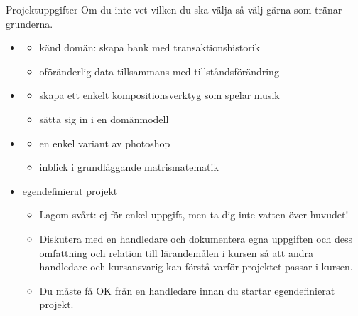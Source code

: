 \begin{Slide}{Projektuppgifter}\SlideFontTiny
Om du inte vet vilken du ska välja så välj gärna  som tränar grunderna.
\begin{itemize}\SlideFontTiny
\item {}
\begin{itemize}\SlideFontTiny
\item känd domän: skapa bank med transaktionshistorik 
\item oföränderlig data tillsammans med tillståndsförändring
\end{itemize}


\item {}
\begin{itemize}\SlideFontTiny
\item skapa ett enkelt kompositionsverktyg som spelar musik
\item sätta sig in i en domänmodell
\end{itemize}

\item {} 
\begin{itemize}\SlideFontTiny
\item en enkel variant av photoshop 
\item inblick i grundläggande matrismatematik
\end{itemize}


\item egendefinierat projekt 
\begin{itemize}\SlideFontTiny
\item Lagom svårt: ej för enkel uppgift, men ta dig inte vatten över huvudet!
\item Diskutera med en handledare och dokumentera egna uppgiften och dess omfattning och relation till lärandemålen i kursen så att andra handledare och kursansvarig kan förstå varför projektet passar i kursen.
\item Du måste få OK från en handledare innan du startar egendefinierat projekt.
\end{itemize}


\end{itemize}

\end{Slide}

